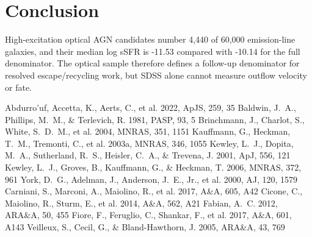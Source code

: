 \documentclass[twocolumn]{aastex631}
\begin{document}
\section{Conclusion}\label{sec:conclusion}
High-excitation optical AGN candidates number 4,440 of 60,000 emission-line galaxies, and their median log sSFR is -11.53 compared with -10.14 for the full denominator. The optical sample therefore defines a follow-up denominator for resolved escape/recycling work, but SDSS alone cannot measure outflow velocity or fate.


\begin{thebibliography}{}
 Abdurro'uf, Accetta, K., Aerts, C., et al. 2022, ApJS, 259, 35
 Baldwin, J.~A., Phillips, M.~M., \& Terlevich, R. 1981, PASP, 93, 5
 Brinchmann, J., Charlot, S., White, S.~D.~M., et al. 2004, MNRAS, 351, 1151
 Kauffmann, G., Heckman, T.~M., Tremonti, C., et al. 2003a, MNRAS, 346, 1055
 Kewley, L.~J., Dopita, M.~A., Sutherland, R.~S., Heisler, C.~A., \& Trevena, J. 2001, ApJ, 556, 121
 Kewley, L.~J., Groves, B., Kauffmann, G., \& Heckman, T. 2006, MNRAS, 372, 961
 York, D.~G., Adelman, J., Anderson, J.~E., Jr., et al. 2000, AJ, 120, 1579
 Carniani, S., Marconi, A., Maiolino, R., et al. 2017, A\&A, 605, A42
 Cicone, C., Maiolino, R., Sturm, E., et al. 2014, A\&A, 562, A21
 Fabian, A.~C. 2012, ARA\&A, 50, 455
 Fiore, F., Feruglio, C., Shankar, F., et al. 2017, A\&A, 601, A143
 Veilleux, S., Cecil, G., \& Bland-Hawthorn, J. 2005, ARA\&A, 43, 769
\end{thebibliography}
\end{document}
